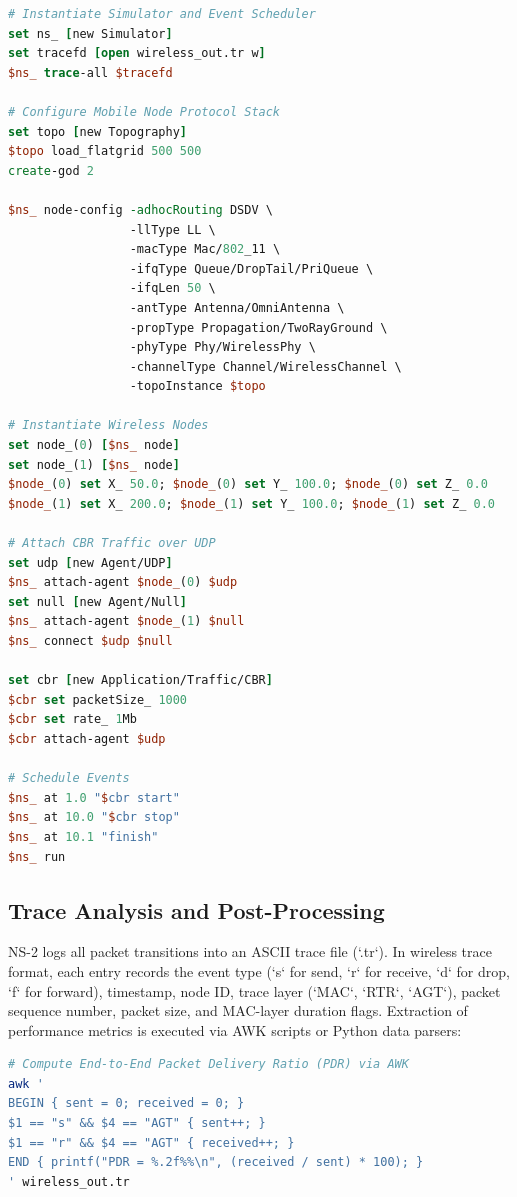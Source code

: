 \begin{lstlisting}[language=tcl, caption={NS-2 OTcl configuration script for a mobile wireless ad-hoc network.}, label={lst:ns2_script}]
# Instantiate Simulator and Event Scheduler
set ns_ [new Simulator]
set tracefd [open wireless_out.tr w]
$ns_ trace-all $tracefd

# Configure Mobile Node Protocol Stack
set topo [new Topography]
$topo load_flatgrid 500 500
create-god 2

$ns_ node-config -adhocRouting DSDV \
                 -llType LL \
                 -macType Mac/802_11 \
                 -ifqType Queue/DropTail/PriQueue \
                 -ifqLen 50 \
                 -antType Antenna/OmniAntenna \
                 -propType Propagation/TwoRayGround \
                 -phyType Phy/WirelessPhy \
                 -channelType Channel/WirelessChannel \
                 -topoInstance $topo

# Instantiate Wireless Nodes
set node_(0) [$ns_ node]
set node_(1) [$ns_ node]
$node_(0) set X_ 50.0; $node_(0) set Y_ 100.0; $node_(0) set Z_ 0.0
$node_(1) set X_ 200.0; $node_(1) set Y_ 100.0; $node_(1) set Z_ 0.0

# Attach CBR Traffic over UDP
set udp [new Agent/UDP]
$ns_ attach-agent $node_(0) $udp
set null [new Agent/Null]
$ns_ attach-agent $node_(1) $null
$ns_ connect $udp $null

set cbr [new Application/Traffic/CBR]
$cbr set packetSize_ 1000
$cbr set rate_ 1Mb
$cbr attach-agent $udp

# Schedule Events
$ns_ at 1.0 "$cbr start"
$ns_ at 10.0 "$cbr stop"
$ns_ at 10.1 "finish"
$ns_ run
\end{lstlisting}

\subsection{Trace Analysis and Post-Processing}
NS-2 logs all packet transitions into an ASCII trace file (`.tr`). In wireless trace format, each entry records the event type (`s` for send, `r` for receive, `d` for drop, `f` for forward), timestamp, node ID, trace layer (`MAC`, `RTR`, `AGT`), packet sequence number, packet size, and MAC-layer duration flags. Extraction of performance metrics is executed via AWK scripts or Python data parsers:
\begin{lstlisting}[language=bash]
# Compute End-to-End Packet Delivery Ratio (PDR) via AWK
awk '
BEGIN { sent = 0; received = 0; }
$1 == "s" && $4 == "AGT" { sent++; }
$1 == "r" && $4 == "AGT" { received++; }
END { printf("PDR = %.2f%%\n", (received / sent) * 100); }
' wireless_out.tr
\end{lstlisting}

